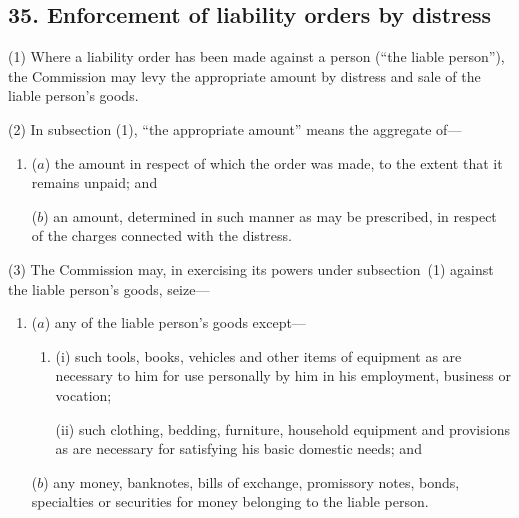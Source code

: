 \documentclass[12pt,a4paper]{article}
\begin{document}


\subsection{35. Enforcement of liability orders by 
distress
}

(1) Where a liability order has been made against a person (“the liable person”), the 
Commission  %
may 
levy the appropriate amount by distress and sale of the liable person’s goods.

(2) In subsection (1), “the appropriate amount” means the aggregate of—
\begin{enumerate}\item[]
($a$) the amount in respect of which the order was made, to the extent that it remains unpaid; and

($b$) an amount, determined in such manner as may be prescribed, in respect of the charges connected with the distress.
\end{enumerate}

(3) The 
Commission  %
may, in exercising 
its  %
powers under subsection~(1)  against the liable person’s goods, seize—
\begin{enumerate}\item[]
($a$) any of the liable person’s goods except—
\begin{enumerate}\item[]
(i) such tools, books, vehicles and other items of equipment as are necessary to him for use personally by him in his employment, business or vocation;

(ii) such clothing, bedding, furniture, household equipment and provisions as are necessary for satisfying his basic domestic needs; and
\end{enumerate}

($b$) any money, banknotes, bills of exchange, promissory notes, bonds, specialties or securities for money belonging to the liable person.
\end{enumerate}
\end{document}
